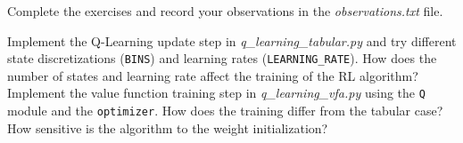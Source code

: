 \documentclass{exam}
\begin{document}
\noindent
Complete the exercises and record your observations in the \emph{observations.txt} file.

\begin{questions}
	Implement the Q-Learning update step in \emph{q\_learning\_tabular.py} and try different state discretizations (\texttt{BINS}) and learning rates (\texttt{LEARNING\_RATE}). How does the number of states and learning rate affect the training of the RL algorithm?
	Implement the value function training step in \emph{q\_learning\_vfa.py} using the \texttt{Q} module and the \texttt{optimizer}. How does the training differ from the tabular case? How sensitive is the algorithm to the weight initialization?
\end{questions}
\end{document}
